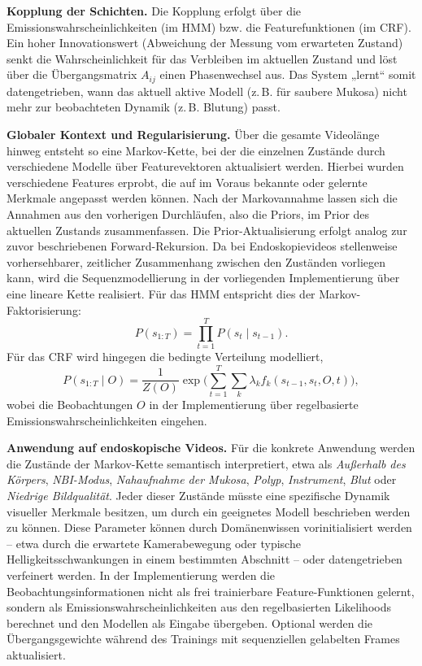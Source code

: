 \vspace{0.5em}
\noindent
\textbf{Kopplung der Schichten.}  
Die Kopplung erfolgt über die Emissionswahrscheinlichkeiten (im HMM) bzw. die Featurefunktionen (im CRF). Ein hoher Innovationswert (Abweichung der Messung vom erwarteten Zustand) senkt die Wahrscheinlichkeit für das Verbleiben im aktuellen Zustand und löst über die Übergangsmatrix $A_{ij}$ einen Phasenwechsel aus.
Das System „lernt“ somit datengetrieben, wann das aktuell aktive Modell (z.\,B. für saubere Mukosa) nicht mehr zur beobachteten Dynamik (z.\,B. Blutung) passt.
\vspace{0.5em}
\noindent

\vspace{0.5em}
\noindent
\textbf{Globaler Kontext und Regularisierung.}  
Über die gesamte Videolänge hinweg entsteht so eine Markov-Kette, bei der die einzelnen Zustände durch verschiedene Modelle über Featurevektoren aktualisiert werden. Hierbei wurden verschiedene Features erprobt, die auf im Voraus bekannte oder gelernte Merkmale angepasst werden können. Nach der Markovannahme lassen sich die Annahmen aus den vorherigen Durchläufen, also die Priors, im Prior des aktuellen Zustands zusammenfassen. Die Prior-Aktualisierung erfolgt analog zur zuvor beschriebenen Forward-Rekursion.
Da bei Endoskopievideos stellenweise vorhersehbarer, zeitlicher Zusammenhang zwischen den Zuständen vorliegen kann, wird die Sequenzmodellierung in der vorliegenden Implementierung über eine lineare Kette realisiert. Für das HMM entspricht dies der Markov-Faktorisierung:
\[
P(s_{1:T}) = \prod_{t=1}^{T} P(s_t \mid s_{t-1}).
\]
Für das CRF wird hingegen die bedingte Verteilung modelliert,
\[
P(s_{1:T}\mid O)=\frac{1}{Z(O)}\exp\Big(\sum_{t=1}^{T}\sum_k \lambda_k f_k(s_{t-1},s_t,O,t)\Big),
\]
wobei die Beobachtungen \(O\) in der Implementierung über regelbasierte Emissionswahrscheinlichkeiten eingehen.


\noindent
\textbf{Anwendung auf endoskopische Videos.}  
Für die konkrete Anwendung werden die Zustände der Markov-Kette semantisch interpretiert, etwa als \emph{Außerhalb des Körpers},  \emph{NBI-Modus}, \emph{Nahaufnahme der Mukosa}, \emph{Polyp}, \emph{Instrument}, \emph{Blut} oder \emph{Niedrige Bildqualität}. Jeder dieser Zustände müsste eine spezifische Dynamik visueller Merkmale besitzen, um durch ein geeignetes Modell beschrieben werden zu können. Diese Parameter können durch Domänenwissen vorinitialisiert werden – etwa durch die erwartete Kamerabewegung oder typische Helligkeitsschwankungen in einem bestimmten Abschnitt – oder datengetrieben verfeinert werden. In der  Implementierung werden die Beobachtungsinformationen nicht als frei trainierbare Feature-Funktionen gelernt, sondern als Emissionswahrscheinlichkeiten aus den regelbasierten Likelihoods berechnet und den Modellen als Eingabe übergeben. Optional werden die Übergangsgewichte während des Trainings mit sequenziellen gelabelten Frames aktualisiert.
\

